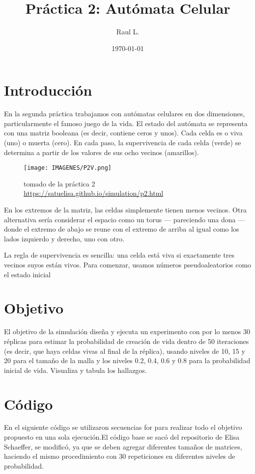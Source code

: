 \documentclass{article}
\author{Raul L.} %
\title{Pr\'{a}ctica 2: Autómata Celular} %
\date{\today}
\begin{document}

\maketitle %


\section{Introducci\'{o}n}\label{intro} %



En la segunda práctica trabajamos con autómatas celulares en dos dimensiones, particularmente el famoso juego de la vida. El estado del autómata se representa con una matriz booleana (es decir, contiene ceros y unos). Cada celda es o viva (uno) o muerta (cero). En cada paso, la supervivencia de cada celda (verde) se determina a partir de los valores de sus ocho vecinos (amarillos)\citep{ejemplo}.

\begin{figure}[h]
     \centering
     \texttt{[image: IMAGENES/P2V.png]}
        \caption{tomado de la práctica 2
    \url{https://satuelisa.github.io/simulation/p2.html}}
     \label{}
 \end{figure}


En los extremos de la matriz, las celdas simplemente tienen menos vecinos. Otra alternativa sería considerar el espacio como un torus — pareciendo una dona — donde el extremo de abajo se reune con el extremo de arriba al igual como los lados izquierdo y derecho, uno con otro.

La regla de supervivencia es sencilla: una celda está viva si exactamente tres vecinos suyos están vivos. Para comenzar, usamos números pseudoaleatorios como el estado inicial\citep{ejemplo}

\section{Objetivo}
El objetivo de la simulaci\'{o}n diseña y ejecuta un experimento con por lo menos 30 r\'{e}plicas para estimar la probabilidad de creaci\'{o}n de vida dentro de 50 iteraciones (es decir, que haya celdas vivas al final de la r\'{e}plica), usando niveles de 10, 15 y 20 para el tamaño de la malla y los niveles 0.2, 0.4, 0.6 y 0.8 para la probabilidad inicial de vida. Visualiza y tabula los hallazgos\citep{ejemplo}.


\section{C\'{o}digo}
En el siguiente c\'{o}digo se utilizaron secuencias for para realizar todo el objetivo propuesto en una sola ejecución.El c\'{o}digo base se sac\'{o} del repositorio de Elisa Schaeffer, se modific\'{o}, ya que se deben agregar diferentes tamaños de matrices, haciendo el mismo procedimiento con 30 repeticiones en diferentes niveles de probabilidad.
\end{document}
